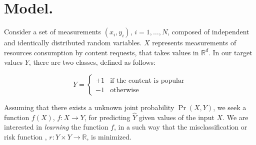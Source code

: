	\section{Model.}

		Consider a set of measurements $(x_i,y_i)$, $i = 1,\dots ,N$, composed
		of independent and identically distributed random variables. $X$ represents 
		measurements of resources consumption
		by content requests, that takes values in $\mathbb{R}^d$. In our target 
		values $Y$, there are two classes, defined as follows:

		\[
			Y = \begin{cases}
        								+1  & \mbox{if the content is popular} \\
       								-1   & \mbox{otherwise}
        						\end{cases}
		\]

		Assuming that there exists a unknown joint probability $\operatorname{Pr}(X,Y)$, 
		we seek a function $f(X)$, $f : X \rightarrow Y$, for predicting $\hat{Y}$ 
		given values of the input $X$. We are interested in \emph{learning} 
		the function $f$, in a such way that the misclassification or risk function ,
		$r : Y \times Y \rightarrow \mathbb{R}$, is minimized.
